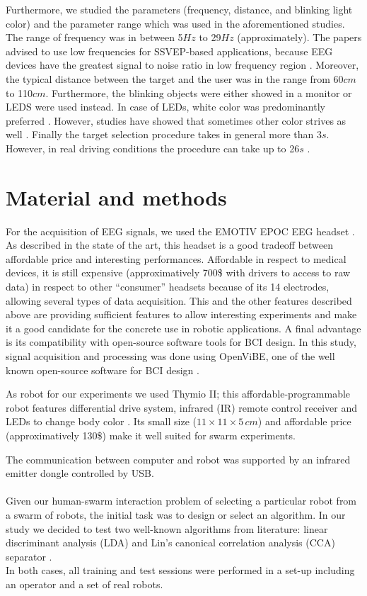\documentclass{svmult}
\begin{document}
Furthermore, we studied the parameters (frequency, distance, and blinking light color) and the parameter range which was used in the aforementioned studies. The range of frequency was in between 5$Hz$ to 29$Hz$ (approximately). The papers advised to use low frequencies for SSVEP-based applications, because EEG devices have the greatest signal to noise ratio in low frequency region \cite{paper6}. Moreover, the typical distance between the target and the user was in the range from 60$cm$ to 110$cm$. Furthermore, the blinking objects were either showed in a monitor or LEDS were used instead. In case of LEDs, white color was predominantly preferred \cite{aljshamee2014beyond, aljshamee2016discriminate}. However, studies have showed that sometimes other color strives as well \cite{SSVEPfiability}. Finally the target selection procedure takes in general more than 3$s$. However, in real driving conditions the procedure can take up to 26$s$ \cite{car}.

\section{Material and methods}
\label{sec:methods}
For the acquisition of EEG signals, we used the EMOTIV EPOC EEG headset \cite{stytsenko2011evaluation}. 
As described in the state of the art, this headset is a good tradeoff between affordable price and interesting performances.
Affordable in respect to medical devices, it is still expensive (approximatively 700\$ with drivers to access to raw data) in respect to other ``consumer'' headsets because of its 14 electrodes, allowing several types of data acquisition. 
This and the other features described above are providing sufficient features to allow interesting experiments and make it a good candidate for the concrete use in robotic applications.
A final advantage is its compatibility with open-source software tools for BCI design. 
In this study, signal acquisition and processing was done using OpenViBE, one of the well known open-source software for BCI design \cite{ov_publication}.

As robot for our experiments we used Thymio II; this affordable-programmable robot features differential drive system, infrared (IR) remote control receiver and LEDs to change body color \cite{Riedo-et-al-2013}. Its small size ($11 \times 11 \times 5\,\mathit{cm}$) and affordable price (approximatively 130\$) make it well suited for swarm experiments. 

The communication between computer and robot was supported by an infrared emitter dongle controlled by USB.\\
\\
Given our human-swarm interaction problem of selecting a particular robot from a swarm of robots, the initial task was to design or select an algorithm. 
In our study we decided to test two well-known algorithms from literature: linear discriminant analysis (LDA) \cite{openvibeSSVEP} and Lin's canonical correlation analysis (CCA) separator \cite{Lin2014}.\\
In both cases, all training and test sessions were performed in a set-up including an operator and a set of real robots.
\end{document}
